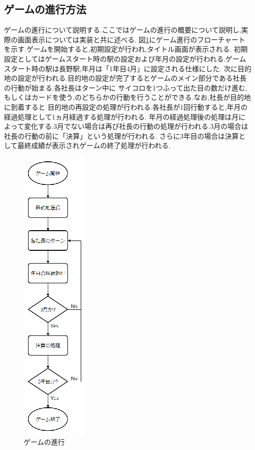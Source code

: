 \documentclass[a4j]{jarticle}
\begin{document}
    \subsection{ゲームの進行方法}
    ゲームの進行について説明する.ここではゲームの進行の概要について説明し,実際の画面表示については実装と共に述べる.
    図\ref{processgame}にゲーム進行のフローチャートを示す.ゲームを開始すると,初期設定が行われ,タイトル画面が表示される.
    初期設定としてはゲームスタート時の駅の設定および年月の設定が行われる.ゲームスタート時の駅は長野駅,年月は「1年目4月」に設定される仕様にした.
    次に目的地の設定が行われる.目的地の設定が完了するとゲームのメイン部分である社長の行動が始まる.各社長はターン中に
    サイコロを1つふって出た目の数だけ進む,もしくはカードを使う,のどちらかの行動を行うことができる.なお,社長が目的地に到着すると
    目的地の再設定の処理が行われる.各社長が1回行動すると,年月の経過処理として1ヵ月経過する処理が行われる.
    年月の経過処理後の処理は月によって変化する.3月でない場合は再び社長の行動の処理が行われる.3月の場合は社長の行動の前に「決算」という処理が行われる.
    さらに3年目の場合は決算として最終成績が表示されゲームの終了処理が行われる.
    \begin{figure}[H]
        \centering
        \includegraphics[scale=2.3]{processgame.eps}
        \caption{ゲームの進行}
         \label{processgame}
        \end{figure}
\end{document}
